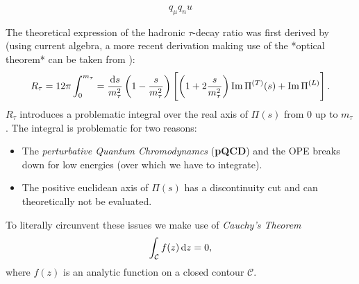 \documentclass[../../index.tex]{subfiles}
\begin{document}
\begin{equation}
  q_\mu q_nu
\end{equation}

The theoretical expression of the hadronic $\tau$-decay ratio was first derived
by \cite{Tsai1971} (using current algebra, a more recent derivation making use
of the *optical theorem* can be taken from \cite{Schwab2002}):
\begin{equation}
  \label{eq:hadronicTauDecayRatio}
  R_\tau = 12 \pi \int_0^{m_\tau} = \frac{\dif s}{m_\tau^2}
  \left( 1 - \frac{s}{m_\tau^2} \right)
  \left[ \left( 1 + 2 \frac{s}{m_\tau^2} \right) \Ima \Pi^{(T)}(s) + \Ima \Pi^{(L)} \right].
\end{equation}
$R_\tau$ introduces a problematic integral over the real axis of $\Pi(s)$ from $0$ up to
$m_\tau$. The integral is problematic for two reasons:
\begin{itemize}
  \item The \textit{perturbative Quantum Chromodynamcs} (\textbf{pQCD}) and the OPE breaks down for low
    energies (over which we have to integrate).
  \item The positive euclidean axis of $\Pi(s)$ has a discontinuity cut and can
    theoretically not be evaluated.
\end{itemize}
To literally circunvent these issues we make use of \textit{Cauchy's Theorem}
\begin{equation}
  \int_{\mathcal{C}} f(z) \dif z = 0,
\end{equation}
where $f(z)$ is an analytic function on a closed contour $\mathcal{C}$.
\end{document}
